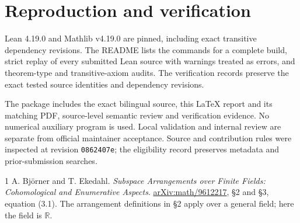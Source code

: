 \documentclass[11pt]{article}
\newcommand{\R}{\mathbb R}
\begin{document}
\section{Reproduction and verification}
Lean 4.19.0 and Mathlib v4.19.0 are pinned, including exact transitive dependency revisions. The README lists the commands for a complete build, strict replay of every submitted Lean source with warnings treated as errors, and theorem-type and transitive-axiom audits. The verification records preserve the exact tested source identities and dependency revisions.

The package includes the exact bilingual source, this LaTeX report and its matching PDF, source-level semantic review and verification evidence. No numerical auxiliary program is used. Local validation and internal review are separate from official maintainer acceptance. Source and contribution rules were inspected at revision \texttt{0862407e}; the eligibility record preserves metadata and prior-submission searches.

\begin{thebibliography}{1}\small
{} A. Bj\"orner and T. Ekedahl. \emph{Subspace Arrangements over Finite Fields: Cohomological and Enumerative Aspects}. \href{https://arxiv.org/abs/math/9612217}{arXiv:math/9612217}, \S2 and \S3, equation (3.1). The arrangement definitions in \S2 apply over a general field; here the field is $\R$.
\end{thebibliography}
\end{document}
